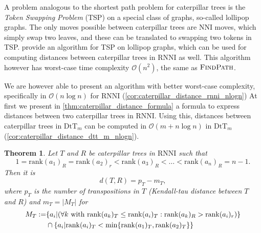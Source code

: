 \documentclass[11pt]{amsart}
\newtheorem{theorem}{Theorem}
\newcommand{\rnni}{\mathrm{RNNI}}
\newcommand{\findpath}{\textsc{FindPath}}
\newcommand{\rank}{\mathrm{rank}}
\newcommand{\nni}{\mathrm{NNI}}
\newcommand{\dtt}{\mathrm{DtT}}
\renewcommand{\O}{\mathcal O}
\begin{document}
A problem analogous to the shortest path problem for caterpillar trees is the \emph{Token Swapping Problem} (TSP) \autocite{Kawahara2017-ey} on a special class of graphs, so-called lollipop graphs.
The only moves possible between caterpillar trees are $\nni$ moves, which simply swap two leaves, and these can be translated to swapping two tokens in TSP.
\textcite{Kawahara2017-ey} provide an algorithm for TSP on lollipop graphs, which can be used for computing distances between caterpillar trees in $\rnni$ as well.
This algorithm however has worst-case time complexity $\O(n^2)$, the same as $\findpath$.

We are however able to present an algorithm with better worst-case complexity, specifically in $\O(n \log n)$ for $\rnni$ (\autoref{cor:caterpillar_distance_rnni_nlogn})
At first we present in \autoref{thm:caterpillar_distance_formula} a formula to express distances between two caterpillar trees in $\rnni$.
Using this, distances between caterpillar trees in $\dtt_m$ can be computed in $\O(m + n \log n)$ in $\dtt_m$ (\autoref{cor:caterpillar_distance_dtt_m_nlogn}).

\begin{theorem}
	Let $T$ and $R$ be caterpillar trees in $\rnni$ such that \[1 = \rank(a_1)_R = \rank(a_2)_r < \rank(a_3)_R < \ldots < \rank(a_n)_R = n-1.\]
	Then it is
	\[d(T,R) = p_T - m_T,\]
	where $p_T$ is the number of transpositions in $T$ (Kendall-tau distance between $T$ and $R$) and $m_T = |M_T|$ for
	\begin{align*}
		M_T := &\{a_i| (\forall k \textnormal{ with } \rank(a_k)_T \leq \rank(a_i)_T: \rank(a_k)_R > \rank(a_i)_r)\} \\
		& \cap \{a_i | \rank(a_i)_T < \min\{\rank(a_1)_T, \rank(a_2)_T\}\}
	\end{align*}
	\label{thm:caterpillar_distance_formula}
\end{theorem}
\end{document}
